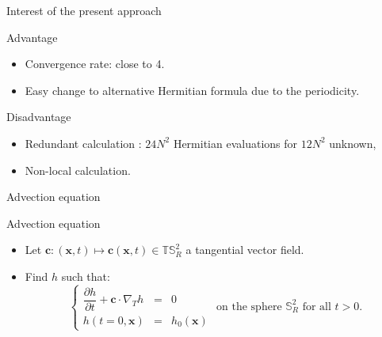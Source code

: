 \documentclass[11pt]{beamer}
\begin{document}
\begin{frame}{Interest of the present approach}
\begin{block}{Advantage}
\begin{itemize}
\item Convergence rate: close to 4.
\item Easy change to alternative Hermitian formula due to the periodicity.
\end{itemize}
\end{block}

\begin{block}{Disadvantage}
\begin{itemize}
\item Redundant calculation : $24N^2$ Hermitian evaluations for $12N^2$ unknown,
\item Non-local calculation.
\end{itemize}
\end{block}
\end{frame}




\begin{frame}{Advection equation}

\begin{block}{Advection equation}
\begin{itemize}
\item Let $\mathbf{c}:(\mathbf{x},t) \mapsto \mathbf{c}(\mathbf{x},t) \in \mathbb{T}\mathbb{S}_R^2$ a tangential vector field.
\item Find $h$ such that:
\begin{equation}
\left\lbrace
\begin{array}{rcl}
\dfrac{\partial h}{\partial t} + \mathbf{c} \cdot \nabla_{T} h & = & 0 \\
h(t=0,\mathbf{x}) & = & h_0(\mathbf{x}) 
\end{array}
\right.
\text{ on the sphere }  \mathbb{S}_R^2 \text{ for all } t>0.
\label{eq: advection}
\end{equation}
\end{itemize}
\end{block}
\end{frame}
\end{document}
